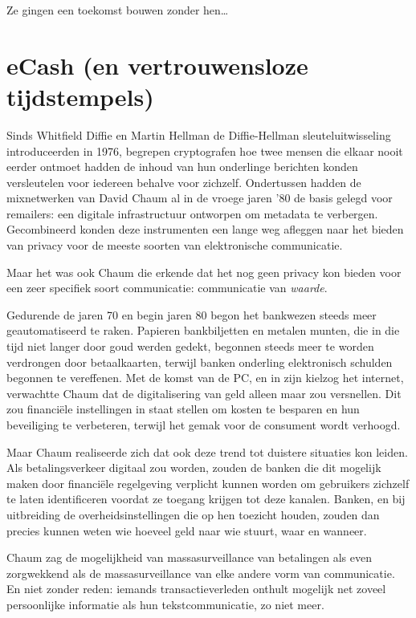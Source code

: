 \documentclass[
  a5paper,
  smalldemyvopaper,11pt,twoside,onecolumn,openright,extrafontsizes]{memoir}
\begin{document}
Ze gingen een toekomst bouwen zonder hen\ldots{}

\chapter{eCash (en vertrouwensloze
tijdstempels)}\label{ecash-en-vertrouwensloze-tijdstempels}

Sinds Whitfield Diffie en Martin Hellman de Diffie-Hellman
sleuteluitwisseling introduceerden in 1976, begrepen cryptografen hoe
twee mensen die elkaar nooit eerder ontmoet hadden de inhoud van hun
onderlinge berichten konden versleutelen voor iedereen behalve voor
zichzelf. Ondertussen hadden de mixnetwerken van David Chaum al in de
vroege jaren '80 de basis gelegd voor remailers: een digitale
infrastructuur ontworpen om metadata te verbergen. Gecombineerd konden
deze instrumenten een lange weg afleggen naar het bieden van privacy
voor de meeste soorten van elektronische communicatie.

Maar het was ook Chaum die erkende dat het nog geen privacy kon bieden
voor een zeer specifiek soort communicatie: communicatie van
\emph{waarde}.

Gedurende de jaren 70 en begin jaren 80 begon het bankwezen steeds meer
geautomatiseerd te raken. Papieren bankbiljetten en metalen munten, die
in die tijd niet langer door goud werden gedekt, begonnen steeds meer te
worden verdrongen door betaalkaarten, terwijl banken onderling
elektronisch schulden begonnen te vereffenen. Met de komst van de PC, en
in zijn kielzog het internet, verwachtte Chaum dat de digitalisering van
geld alleen maar zou versnellen. Dit zou financiële instellingen in
staat stellen om kosten te besparen en hun beveiliging te verbeteren,
terwijl het gemak voor de consument wordt verhoogd.

Maar Chaum realiseerde zich dat ook deze trend tot duistere situaties
kon leiden. Als betalingsverkeer digitaal zou worden, zouden de banken
die dit mogelijk maken door financiële regelgeving verplicht kunnen
worden om gebruikers zichzelf te laten identificeren voordat ze toegang
krijgen tot deze kanalen. Banken, en bij uitbreiding de
overheidsinstellingen die op hen toezicht houden, zouden dan precies
kunnen weten wie hoeveel geld naar wie stuurt, waar en wanneer.

Chaum zag de mogelijkheid van massasurveillance van betalingen als even
zorgwekkend als de massasurveillance van elke andere vorm van
communicatie. En niet zonder reden: iemands transactieverleden onthult
mogelijk net zoveel persoonlijke informatie als hun tekstcommunicatie,
zo niet meer.
\end{document}
